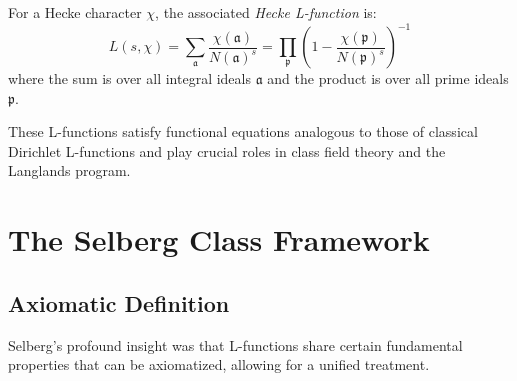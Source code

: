 \begin{definition}
For a Hecke character $\chi$, the associated \emph{Hecke L-function} is:
\begin{equation}
L(s,\chi) = \sum_{\mathfrak{a}} \frac{\chi(\mathfrak{a})}{N(\mathfrak{a})^s} = \prod_{\mathfrak{p}} \left(1 - \frac{\chi(\mathfrak{p})}{N(\mathfrak{p})^s}\right)^{-1}
\end{equation}
where the sum is over all integral ideals $\mathfrak{a}$ and the product is over all prime ideals $\mathfrak{p}$.
\end{definition}

These L-functions satisfy functional equations analogous to those of classical Dirichlet L-functions and play crucial roles in class field theory and the Langlands program.

\section{The Selberg Class Framework}
\label{sec:selberg-class}

\subsection{Axiomatic Definition}

Selberg's profound insight was that L-functions share certain fundamental properties that can be axiomatized, allowing for a unified treatment.

